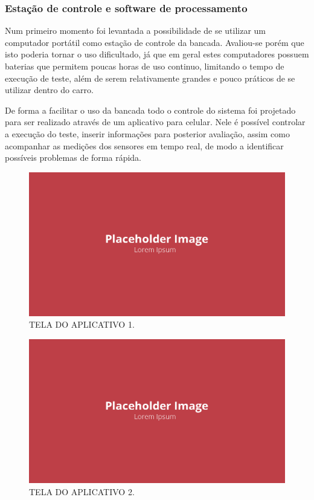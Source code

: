 \subsubsection{Estação de controle e software de processamento}

Num primeiro momento foi levantada a possibilidade de se utilizar um computador portátil como estação de controle da bancada. Avaliou-se porém que isto poderia tornar o uso dificultado, já que em geral estes computadores possuem baterias que permitem poucas horas de uso continuo, limitando o tempo de execução de teste, além de serem relativamente grandes e pouco práticos de se utilizar dentro do carro.

De forma a facilitar o uso da bancada todo o controle do sistema foi projetado para ser realizado através de um aplicativo para celular. Nele é possível controlar a execução do teste, inserir informações para posterior avaliação, assim como acompanhar as medições dos sensores em tempo real, de modo a identificar possíveis problemas de forma rápida.

\begin{figure}[!ht]
    \centering
    \includegraphics[width=.8\linewidth]{figuras/outras/placeholder.png}
    \caption{TELA DO APLICATIVO 1\cite{autor}.}
    \label{fig:tela_aplicativo_1}
\end{figure}

\begin{figure}[!ht]
    \centering
    \includegraphics[width=.8\linewidth]{figuras/outras/placeholder.png}
    \caption{TELA DO APLICATIVO 2\cite{autor}.}
    \label{fig:tela_aplicativo_2}
\end{figure}

